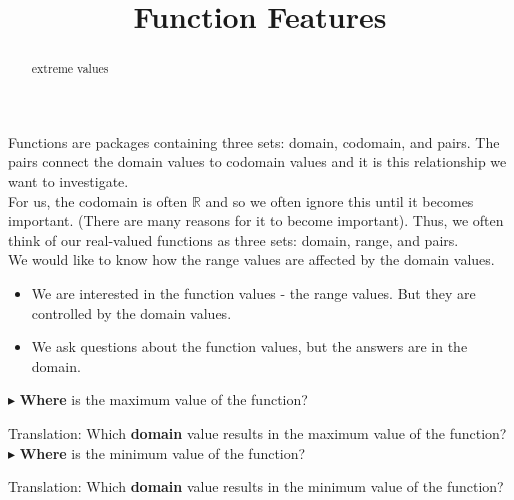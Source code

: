 \documentclass{ximera}
\title{Function Features}
\begin{document}
\begin{abstract}
extreme values
\end{abstract}
\maketitle





Functions are packages containing three sets: domain, codomain, and pairs.  The pairs connect the domain values to codomain values and it is this relationship we want to investigate.   \\


For us, the codomain is often $\mathbb{R}$ and so we often ignore this until it becomes important.  (There are many reasons for it to become important).  Thus, we often think of our real-valued functions as three sets: domain, range, and pairs. \\


We would like to know how the range values are affected by the domain values. \\


\begin{itemize}
\item We are interested in the function values - the range values.  But they are controlled by the domain values. \\
\item We ask questions about the function values, but the answers are in the domain.
\end{itemize}




\begin{idea}


$\blacktriangleright$ \textbf{\textcolor{purple!85!blue}{Where}} is the maximum value of the function? 

Translation: Which \textbf{\textcolor{purple!85!blue}{domain}} value results in the maximum value of the function? \\


$\blacktriangleright$ \textbf{\textcolor{purple!85!blue}{Where}} is the minimum value of the function? 

Translation: Which \textbf{\textcolor{purple!85!blue}{domain}} value results in the minimum value of the function? \\


\end{idea}
\end{document}
